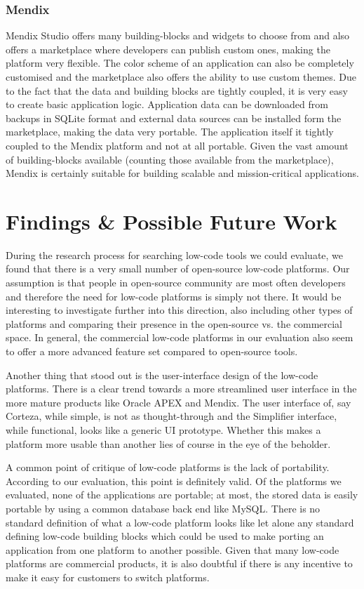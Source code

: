 \documentclass[runningheads]{llncs}
\begin{document}
\subsubsection{Mendix}

Mendix Studio offers many building-blocks and widgets to choose from and also offers a marketplace where developers can publish custom ones, making the platform very flexible. The color scheme of an application can also be completely customised and the marketplace also offers the ability to use custom themes. Due to the fact that the data and building blocks are tightly coupled, it is very easy to create basic application logic. Application data can be downloaded from backups in SQLite format and external data sources can be installed form the marketplace, making the data very portable. The application itself it tightly coupled to the Mendix platform and not at all portable. Given the vast amount of building-blocks available (counting those available from the marketplace), Mendix is certainly suitable for building scalable and mission-critical applications.

\section{Findings \& Possible Future Work}
\label{sec:findings}

During the research process for searching low-code tools we could evaluate, we found that there is a very small number of open-source low-code platforms. Our assumption is that people in open-source community are most often developers and therefore the need for low-code platforms is simply not there. It would be interesting to investigate further into this direction, also including other types of platforms and comparing their presence in the open-source vs. the commercial space. In general, the commercial low-code platforms in our evaluation also seem to offer a more advanced feature set compared to open-source tools.

Another thing that stood out is the user-interface design of the low-code platforms. There is a clear trend towards a more streamlined user interface in the more mature products like Oracle APEX and Mendix. The user interface of, say Corteza, while simple, is not as thought-through and the Simplifier interface, while functional, looks like a generic UI prototype. Whether this makes a platform more usable than another lies of course in the eye of the beholder.

A common point of critique of low-code platforms is the lack of portability. According to our evaluation, this point is definitely valid. Of the platforms we evaluated, none of the applications are portable; at most, the stored data is easily portable by using a common database back end like MySQL. There is no standard definition of what a low-code platform looks like let alone any standard defining low-code building blocks which could be used to make porting an application from one platform to another possible. Given that many low-code platforms are commercial products, it is also doubtful if there is any incentive to make it easy for customers to switch platforms.
\end{document}

